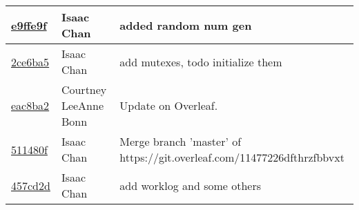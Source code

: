 \begin{tabular}{l l l}
\href{https://github.com/courtbonn/CS-444/commit/e9ffe9fbcfb4d2a6bb673562ae04c8d216c1c3e6}{e9ffe9f} & Isaac Chan & added random num gen\\\hline
\href{https://github.com/courtbonn/CS-444/commit/2ce6ba5159eb06aa6a7be44c592baed2aa77110e}{2ce6ba5} & Isaac Chan & add mutexes, todo initialize them\\\hline
\href{https://github.com/courtbonn/CS-444/commit/eac8ba2b7965db5bfb9e6376065afe7741d4c2fa}{eac8ba2} & Courtney LeeAnne Bonn & Update on Overleaf.\\\hline
\href{https://github.com/courtbonn/CS-444/commit/511480f95502d47b6c119da5258b40d8176304cc}{511480f} & Isaac Chan & Merge branch 'master' of https://git.overleaf.com/11477226dfthrzfbbvxt\\\hline
\href{https://github.com/courtbonn/CS-444/commit/457cd2df4e9dde04402da1bfb8b9e45a5532b65d}{457cd2d} & Isaac Chan & add worklog and some others\\\hline\end{tabular}
